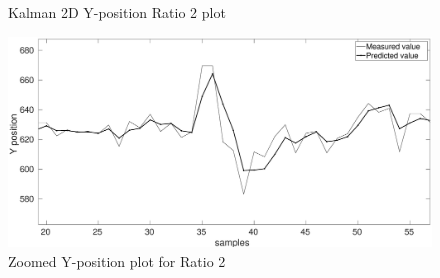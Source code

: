 \documentclass[12pt]{article}
\begin{document}
\begin{figure}[hb!]
\begin{minipage}{0.5\textwidth}
	\caption{Kalman 2D Y-position Ratio 2 plot }
	\label{fig:kalman 2D YRat2}
\end{minipage}%
\begin{minipage}{0.5\textwidth}
\centering
	\includegraphics[width = \textwidth]{./Figures/part2Ratio2Yzoomed.eps}
	\caption{ Zoomed Y-position plot for Ratio 2}
	\label{fig: kalman 2D YRat2 zoom}
\end{minipage}
\end{figure}
\end{document}
